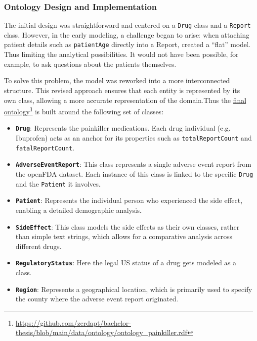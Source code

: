 \subsubsection{Ontology Design and Implementation}
The initial design was straightforward and centered on a \texttt{Drug} class and a \texttt{Report} class. However, in the early modeling, a challenge began to arise: when attaching patient details such as \texttt{patientAge} directly into a Report, created a ``flat'' model. Thus limiting the analytical possibilities. It would not have been possible, for example, to ask questions about the patients themselves.

To solve this problem, the model was reworked into a more interconnected structure. This revised approach ensures that each entity is represented by its own class, allowing a more accurate representation of the domain.Thus the \href{https://github.com/zerdapt/bachelor-thesis/blob/main/data/ontology/ontology_painkiller.rdf}{final ontology}\footnote{\url{https://github.com/zerdapt/bachelor-thesis/blob/main/data/ontology/ontology_painkiller.rdf}} is built around the following set of classes:
\begin{itemize}
    \item \textbf{\texttt{Drug}}: Represents the painkiller medications. Each drug individual (e.g. Ibuprofen) acts as an anchor for its properties such as \texttt{totalReportCount} and \texttt{fatalReportCount}.
    \item \textbf{\texttt{AdverseEventReport}}: This class represents a single adverse event report from the openFDA dataset. Each instance of this class is linked to the specific \texttt{Drug} and the \texttt{Patient} it involves.
    \item \textbf{\texttt{Patient}}: Represents the individual person who experienced the side effect, enabling a detailed demographic analysis.
    \item \textbf{\texttt{SideEffect}}: This class models the side effects as their own classes, rather than simple text strings, which allows for a comparative analysis across different drugs.
    \item \textbf{\texttt{RegulatoryStatus}}: Here the legal US status of a drug gets modeled as a class.
    \item \textbf{\texttt{Region}}: Represents a geographical location, which is primarily used to specify the county where the adverse event report originated.
\end{itemize}

